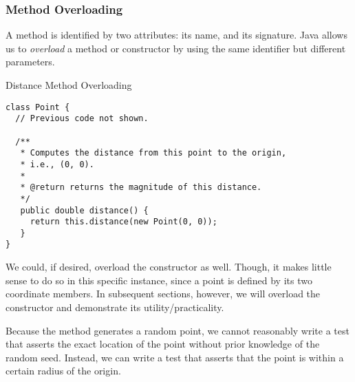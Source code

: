 \subsubsection*{Method Overloading}
A method is identified by two attributes: its name, and its signature. Java allows us to \textit{overload} a method or constructor by using the same identifier but different parameters.


\begin{cl}{Distance Method Overloading}
\begin{lstlisting}[language=MyJava]
class Point {
  // Previous code not shown.
  
  /**
   * Computes the distance from this point to the origin,
   * i.e., (0, 0).
   *
   * @return returns the magnitude of this distance.
   */
   public double distance() {
     return this.distance(new Point(0, 0));
   }
}
\end{lstlisting}
\end{cl} 

We could, if desired, overload the  constructor as well. Though, it makes little sense to do so in this specific instance, since a point is defined by its two coordinate members. In subsequent sections, however, we will overload the constructor and demonstrate its utility/practicality.


Because the  method generates a random point, we cannot reasonably write a test that asserts the exact location of the point without prior knowledge of the random seed. Instead, we can write a test that asserts that the point is within a certain radius of the origin. 

